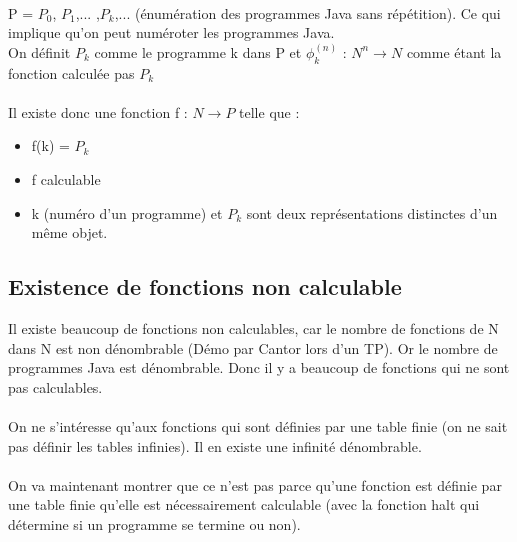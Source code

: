 \documentclass[11pt,a4paper]{article}
\begin{document}
\paragraph{} P = $P_0$, $P_1$,... ,$P_k$,... (énumération des programmes Java 
sans répétition). Ce qui implique qu'on peut numéroter les programmes Java.\\
On définit $P_k$ comme le programme k dans P et $\phi^{(n)}_k$ : $N^n 
\rightarrow N$ comme étant la fonction calculée pas $P_k$

\paragraph{} Il existe donc une fonction f : $N\rightarrow P$ telle que :
\begin{itemize}
	\item f(k) = $P_k$
	\item f calculable
	\item k (numéro d'un programme) et $P_k$ sont deux représentations 
		distinctes d'un même objet.
\end{itemize}

\subsection{Existence de fonctions non calculable}
\label{sub:existence_de_fonction_non_calculables}
Il existe beaucoup de fonctions non calculables, car le nombre de fonctions de N 
dans N est non dénombrable (Démo par Cantor lors d'un TP). Or le nombre de 
programmes Java est dénombrable. Donc il y a beaucoup de fonctions qui ne sont 
pas calculables.

\paragraph{} On ne s'intéresse qu'aux fonctions qui sont définies par une table 
finie (on ne sait pas définir les tables infinies). Il en existe une infinité 
dénombrable.

\paragraph{} On va maintenant montrer que ce n'est pas parce qu’une fonction 
est définie par une table finie qu'elle est nécessairement calculable (avec la 
fonction halt qui détermine si un programme se termine ou non).

\end{document}
